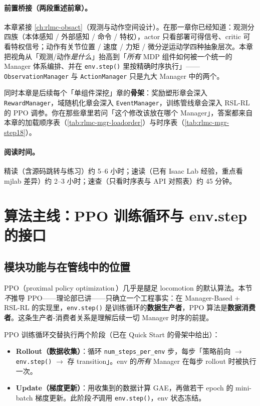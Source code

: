 \paragraph{前置桥接（两段重述前章）。}本章紧接 \cref{ch:rlmc-obsact}（观测与动作空间设计）。在那一章你已经知道：观测分四族（本体感知 / 外部感知 / 命令 / 特权），actor 只看部署可得信号、critic 可看特权信号；动作有关节位置 / 速度 / 力矩 / 微分逆运动学四种抽象层次。本章把视角从「观测/动作\emph{是什么}」抬高到「\emph{所有} MDP 组件如何被一个统一的 Manager 体系编排、并在 \verb|env.step()| 里按精确时序执行」——\verb|ObservationManager| 与 \verb|ActionManager| 只是九大 Manager 中的两个。

同时本章是后续每个「单组件深挖」章的\textbf{骨架}：奖励塑形章会深入 \verb|RewardManager|，域随机化章会深入 \verb|EventManager|，训练管线章会深入 RSL-RL 的 PPO 调参。你在那些章里若问「这个修改该放在哪个 Manager」，答案都来自本章的加载顺序表（\cref{tab:rlmc-mgr-loadorder}）与时序表（\cref{tab:rlmc-mgr-step18}）。

\paragraph{阅读时间。}精读（含源码跳转与练习）约 5--6 小时；速读（已有 Isaac Lab 经验，重点看 mjlab 差异）约 2--3 小时；速查（只看时序表与 API 对照表）约 45 分钟。

\section{算法主线：PPO 训练循环与 env.step 的接口}
\label{sec:rlmc-mgr-ppo}

\subsection{模块功能与在管线中的位置}

PPO（proximal policy optimization\,\cite{schulman2017ppo}）几乎是腿足 locomotion 的默认算法。本节\emph{不}推导 PPO——理论部已讲——只确立一个工程事实：在 Manager-Based + RSL-RL 的实现里，\verb|env.step()| 是训练循环的\textbf{数据生产者}，PPO 算法是\textbf{数据消费者}。这条生产者-消费者关系是理解后续一切 Manager 时序的前提。

PPO 训练循环交替执行两个阶段（已在 Quick Start 的骨架中给出）：

\begin{itemize}
  \item \textbf{Rollout（数据收集）}：循环 \verb|num_steps_per_env| 步，每步「策略前向 $\to$ \verb|env.step()| $\to$ 存 transition」。env 的\emph{所有} Manager 在每步 rollout 时被执行一次。
  \item \textbf{Update（梯度更新）}：用收集到的数据计算 GAE，再做若干 epoch 的 mini-batch 梯度更新。此阶段\emph{不}调用 \verb|env.step()|，env 状态冻结。
\end{itemize}

